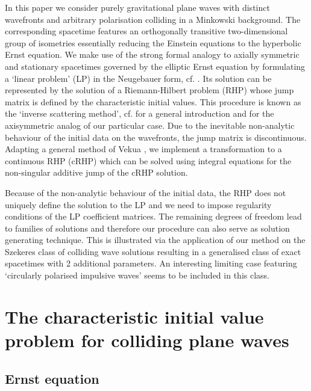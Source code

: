 \documentclass[12pt]{iopart}
\begin{document}
In this paper we consider purely gravitational plane waves with distinct wavefronts and arbitrary polarisation colliding in a Minkowski background. The corresponding spacetime features an orthogonally transitive two-dimensional group of isometries essentially reducing the Einstein equations to the hyperbolic Ernst equation. We make use of the strong formal analogy to axially symmetric and stationary spacetimes governed by the elliptic Ernst equation by formulating a `linear problem' (LP) in the Neugebauer form, cf. \cite{Neugebauer_Meinel2003}. Its solution can be represented by the solution of a Riemann-Hilbert problem (RHP) whose jump matrix is defined by the characteristic initial values. This procedure is known as the `inverse scattering method', cf. \cite{Belinski_Verdaguer2001} for a general introduction and \cite{Neugebauer_Meinel2003} for the axisymmetric analog of our particular case. Due to the inevitable non-analytic behaviour of the initial data on the wavefronts, the jump matrix is discontinuous. Adapting a general method of Vekua \cite{Vekua1967}, we implement a transformation to a continuous RHP (cRHP) which can be solved using integral equations for the non-singular additive jump of the cRHP solution. 

Because of the non-analytic behaviour of the initial data, the RHP does not uniquely define the solution to the LP and we need to impose regularity conditions of the LP coefficient matrices. The remaining degrees of freedom lead to families of solutions and therefore our procedure can also serve as solution generating technique. This is illustrated via the application of our method on the Szekeres class \cite{Szekeres1972} of colliding wave solutions resulting in a generalised class of exact spacetimes with 2 additional parameters. An interesting limiting case featuring `circularly polarised impulsive waves' seems to be included in this class.


\section{The characteristic initial value problem for colliding plane waves}

\subsection{Ernst equation}
\end{document}
